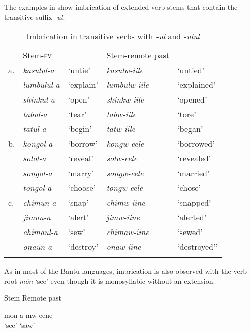 \documentclass[output=paper]{langsci/langscibook}
\begin{document}
\z

The examples in  show imbrication of extended verb stems that contain the transitive suffix \textit{-ul}.


\begin{table}
\begin{tabular}{lllll}
\lsptoprule
 & Stem-\textsc{fv} &  & Stem-remote past & \\
a. & \textit{kasulul-a} & `untie' & \textit{kasulw-iile} & `untied' \\
 & \textit{lumbulul-a} & `explain' & \textit{lumbulw-iile} & `explained' \\
 & \textit{shinkul-a} & `open' & \textit{shinkw-iile} & `opened' \\
 & \textit{tabul-a} & `tear' & \textit{tabw-iile} & `tore' \\
 & \textit{tatul-a} & `begin' & \textit{tatw-iile} & `began' \\

b. & \textit{kongol-a} & `borrow' & \textit{kongw-eele} & `borrowed' \\
 & \textit{solol-a} & `reveal' & \textit{solw-eele} & `revealed' \\
 & \textit{songol-a} & `marry' & \textit{songw-eele} & `married' \\
 & \textit{tongol-a} & `choose' & \textit{tongw-eele} & `chose' \\

c. & \textit{chimun-a} & `snap' & \textit{chimw-iine} & `snapped' \\
 & \textit{jimun-a} & `alert' & \textit{jimw-iine} & `alerted' \\
 & \textit{chimaul-a} & `sew' & \textit{chimaw-iine} & `sewed' \\
 & \textit{onaun-a} & `destroy' & \textit{onaw-iine} & `destroyed’' \\

\lspbottomrule
\end{tabular}

\caption{Imbrication in transitive verbs with \textit{-ul} and \textit{-ulul}}
\label{tab:23.kawasha}

\end{table}


As in most of the Bantu languages, imbrication is also observed with the verb root \textit{món} ‘see’ even though it is monosyllabic without an extension. 

\ea
\label{ex:8.kawasha}
   Stem  Remote past

\gll    mon-a  mw-eene  \\
‘see’  ‘saw’ \\
\z
\end{document}
